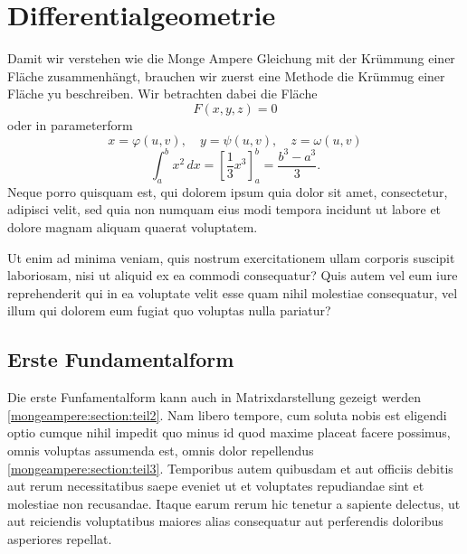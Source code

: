%
%
%
%
\section{Differentialgeometrie
\label{mongeampere:section:teil1}}
Damit wir verstehen wie die Monge Ampere Gleichung mit der 
Krümmung einer Fläche zusammenhängt, brauchen wir zuerst eine Methode die 
Krümmug einer Fläche yu beschreiben.
Wir betrachten dabei die Fläche
\begin{equation}
  F(x, y, z) = 0
  \label{mongeampere:area}
\end{equation}
oder in parameterform
\begin{equation}
  x = \varphi(u,v), \quad y = \psi(u,v), \quad z = \omega(u,v)
  \label{mongeampere:areaparam}
\end{equation}
\begin{equation}
\int_a^b x^2\, dx
=
\left[ \frac13 x^3 \right]_a^b
=
\frac{b^3-a^3}3.
\label{mongeampere:equation1}
\end{equation}
Neque porro quisquam est, qui dolorem ipsum quia dolor sit amet,
consectetur, adipisci velit, sed quia non numquam eius modi tempora
incidunt ut labore et dolore magnam aliquam quaerat voluptatem.

Ut enim ad minima veniam, quis nostrum exercitationem ullam corporis
suscipit laboriosam, nisi ut aliquid ex ea commodi consequatur?
Quis autem vel eum iure reprehenderit qui in ea voluptate velit
esse quam nihil molestiae consequatur, vel illum qui dolorem eum
fugiat quo voluptas nulla pariatur?

\subsection{Erste Fundamentalform
\label{mongeampere:subsection:finibus}}
  Die erste Funfamentalform kann auch in Matrixdarstellung gezeigt werden
\ref{mongeampere:section:teil2}.
Nam libero tempore, cum soluta nobis est eligendi optio cumque nihil
impedit quo minus id quod maxime placeat facere possimus, omnis
voluptas assumenda est, omnis dolor repellendus
\ref{mongeampere:section:teil3}.
Temporibus autem quibusdam et aut officiis debitis aut rerum
necessitatibus saepe eveniet ut et voluptates repudiandae sint et
molestiae non recusandae.
Itaque earum rerum hic tenetur a sapiente delectus, ut aut reiciendis
voluptatibus maiores alias consequatur aut perferendis doloribus
asperiores repellat.


